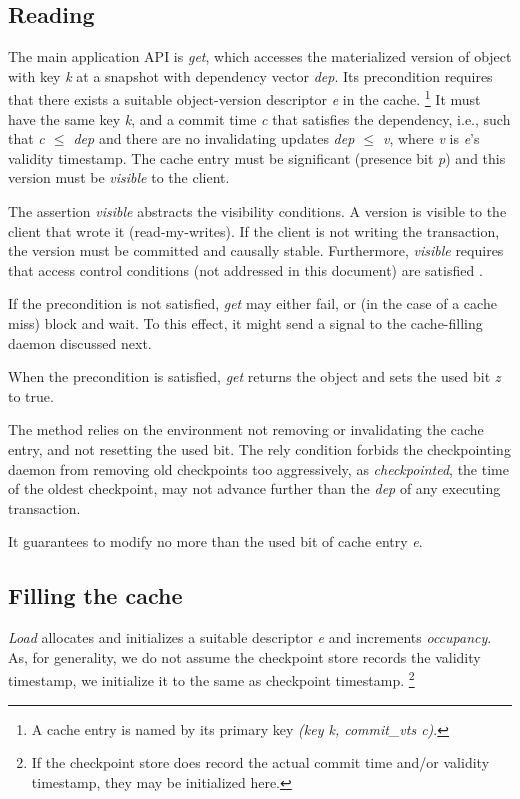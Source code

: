 \documentclass[twoside]{article}
\begin{document}
\subsection{Reading}
\label{sec:reading}

The main application API is \emph{get}, which accesses the materialized
version of object with key \emph{k} at a snapshot with dependency vector
\emph{dep}.
Its precondition requires that there exists a suitable object-version
descriptor \emph{e} in the cache.%
%
\footnote{
%
  A cache entry is named by its primary key \emph{(key k,
  commit\_vts c)}.
}
%
It must have the same key \emph{k}, and a commit time \emph{c} that
satisfies the dependency, i.e., such that \emph{c $\le$ dep} and there
are no invalidating updates \emph{dep $\le$ v}, where \emph{v} is
\emph{e}'s validity timestamp.
The cache entry must be significant (presence bit \emph{p}) and this
version must be \emph{visible} to the client.

The assertion \emph{visible} abstracts the visibility conditions.
A version is visible to the client that wrote it (read-my-writes).
If the client is not writing the transaction, the version must be
committed and causally stable.
Furthermore, \emph{visible} requires that access control conditions (not
addressed in this document) are satisfied \cite{sec:rep:1786}.

If the precondition is not satisfied, \emph{get} may either fail, or (in
the case of a cache miss) block and wait.
To this effect, it might send a signal to the cache-filling daemon
discussed next.

When the precondition is satisfied, \emph{get} returns the object and
sets the used bit \emph{z} to true.

The method relies on the environment not removing or invalidating the
cache entry, and not resetting the used bit.
The rely condition forbids the checkpointing daemon from removing old
checkpoints too aggressively, as \emph{checkpointed}, the time of the
oldest checkpoint, may not advance further than the \emph{dep} of any
executing transaction.

It guarantees to modify no more than the used bit of cache entry
\emph{e}.

\subsection{Filling the cache}
\label{sec:cache-loading}

\emph{Load} allocates and initializes a suitable descriptor \emph{e} and
increments \emph{occupancy}.
As, for generality, we do not assume the checkpoint store records the
validity timestamp, we initialize it to the same as checkpoint
timestamp.%
%
\footnote{
%
  If the checkpoint store does record the actual commit time
  and{\slash}or validity timestamp, they may be initialized here.
}
\end{document}
